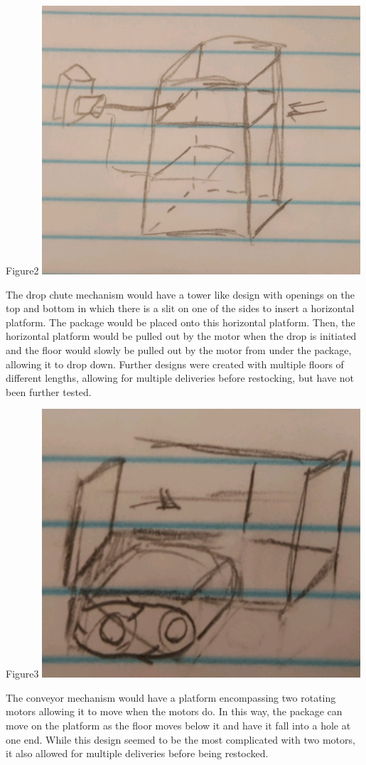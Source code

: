 \documentclass{article}
\begin{document}
   \begin{center} Figure2 {\includegraphics[height=10cm]{DropChute.png}}\end{center}
    The drop chute mechanism would have a tower like design with openings on the top and bottom in which there is a slit on one of the sides to insert a horizontal platform. The package would be placed onto this horizontal platform. Then, the horizontal platform would be pulled out by the motor when the drop is initiated and the floor would slowly be pulled out by the motor from under the package, allowing it to drop down. Further designs were created with multiple floors of different lengths, allowing for multiple deliveries before restocking, but have not been further tested. 
    
    \begin{center}Figure3 {\includegraphics[height=10cm]{Conveyor.png}}\end{center}
    The conveyor mechanism would have a platform encompassing two rotating motors allowing it to move when the motors do. In this way, the package can move on the platform as the floor moves below it and have it fall into a hole at one end. While this design seemed to be the most complicated with two motors, it also allowed for multiple deliveries before being restocked. 
\end{document}

